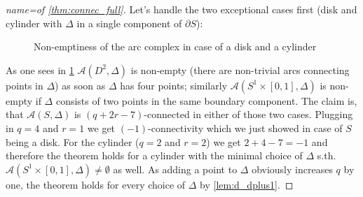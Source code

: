\begin{proof}[{name={of \autoref{thm:connec_full}}}]
	Let's handle the two exceptional cases first (disk and cylinder with $\Delta$ in a single component of $\partial S$):
	\begin{figure}[htb]
		\centering
		\caption{Non-emptiness of the arc complex in case of a disk and a cylinder}\label{fig:non-empty}
	\end{figure}
	As one sees in \cref{fig:non-empty} $\mathcal{A}(D^2,\Delta)$ is non-empty (there are non-trivial arcs connecting points in $\Delta$) as soon as $\Delta$ has four points; similarly $\mathcal{A}(S^1 \times [0,1],\Delta)$ is non-empty if $\Delta$ consists of two points in the same boundary component.
	The claim is, that $\mathcal{A}(S,\Delta)$ is $(q+2r -7)$-connected in either of those two cases.
	Plugging in $q=4$ and $r=1$ we get $(-1)$-connectivity which we just showed in case of $S$ being a disk.
	For the cylinder ($q=2$ and $r=2$) we get $2 +4 -7 =-1$ and therefore the theorem holds for a cylinder with the minimal choice of $\Delta$ s.th. $\mathcal{A}(S^1\times [0,1],\Delta) \neq \emptyset$ as well.
	As adding a point to $\Delta$ obviously increases $q$ by one, the theorem holds for every choice of $\Delta$ by \autoref{lem:d_dplus1}.
	

\end{proof}
